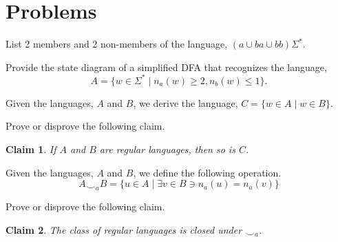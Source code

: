 \documentclass[addpoints]{exam}
\theoremstyle{claim}
\newtheorem{claim}{Claim}
\begin{document}
\section*{Problems}
\begin{questions}

\question[15] List 2 members and 2 non-members of the language, $(a \cup ba \cup bb)\Sigma^*$.
  \begin{solution}

  \end{solution}
\question[20] Provide the state diagram of a simplified DFA that recognizes the language, 
  \[
    A=\{w\in\Sigma^* \mid n_a(w) \ge 2, n_b(w) \le 1\}.
  \]
  \begin{solution} 

  \end{solution}

  
\question[30] Given the languages, $A$ and $B$, we derive the language, $C = \{ w\in A \mid w \in B \}$.

  Prove or disprove the following claim.
  \begin{claim}
    If $A$ and $B$ are regular languages, then so is $C$.
  \end{claim}
  
  \begin{solution}
    
  \end{solution}
  
\question[35] Given the languages, $A$ and $B$, we define the following operation.
  \[
    A\smile_a B = \{ u\in A \mid \exists v\in B \ni n_a(u) = n_a(v) \}
  \]

  Prove or disprove the following claim.
  \begin{claim}
    The class of regular languages is closed under $\smile_a$.
  \end{claim}

  \begin{solution}
    
  \end{solution}
\end{questions}
\end{document}
